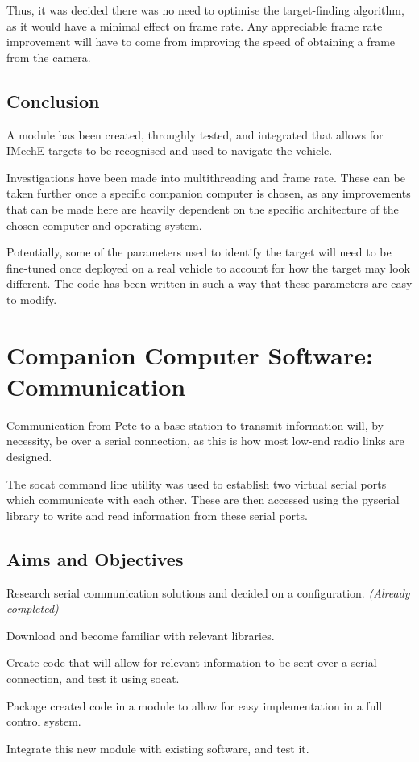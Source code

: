 \documentclass[11pt]{article}
\begin{document}
Thus, it was decided there was no need to optimise the target-finding algorithm, as it would have a minimal effect on frame rate. Any appreciable frame rate improvement will have to come from improving the speed of obtaining a frame from the camera.

\subsection{Conclusion}
A module has been created, throughly tested, and integrated that allows for IMechE targets to be recognised and used to navigate the vehicle.

Investigations have been made into multithreading and frame rate. These can be taken further once a specific companion computer is chosen, as any improvements that can be made here are heavily dependent on the specific architecture of the chosen computer and operating system.

Potentially, some of the parameters used to identify the target will need to be fine-tuned once deployed on a real vehicle to account for how the target may look different. The code has been written in such a way that these parameters are easy to modify.

\section{Companion Computer Software: Communication}
Communication from Pete to a base station to transmit information will, by necessity, be over a serial connection, as this is how most low-end radio links are designed.

The socat command line utility was used to establish two virtual serial ports which communicate with each other. These are then accessed using the pyserial library to write and read information from these serial ports.

\subsection{Aims and Objectives}
\begin{compactenum}
    \item Research serial communication solutions and decided on a configuration. \emph{(Already completed)}
    \item Download and become familiar with relevant libraries.
    \item Create code that will allow for relevant information to be sent over a serial connection, and test it using socat.
    \item Package created code in a module to allow for easy implementation in a full control system.
    \item Integrate this new module with existing software, and test it.
\end{compactenum}
\end{document}
